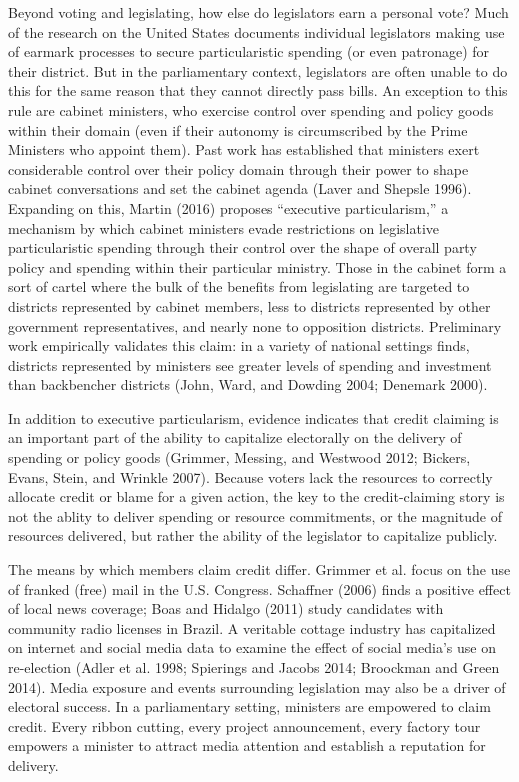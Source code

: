 \documentclass[letter,12pt]{article}
\begin{document}
Beyond voting and legislating, how else do legislators earn a personal vote? Much of the research on the United States documents individual legislators making use of earmark processes to secure particularistic spending (or even patronage) for their district. But in the parliamentary context, legislators are often unable to do this for the same reason that they cannot directly pass bills. An exception to this rule are cabinet ministers, who exercise control over spending and policy goods within their domain (even if their autonomy is circumscribed by the Prime Ministers who appoint them). Past work  has established that ministers exert considerable control over their policy domain through their power to shape cabinet conversations and set the cabinet agenda (Laver and Shepsle 1996). Expanding on this, Martin (2016) proposes ``executive particularism,'' a mechanism by which cabinet ministers evade restrictions on legislative particularistic spending through their control over the shape of overall party policy and spending within their particular ministry. Those in the cabinet form a sort of cartel where the bulk of the benefits from legislating are targeted to districts represented by cabinet members, less to districts represented by other government representatives, and nearly none to opposition districts. Preliminary work empirically validates this claim: in a variety of national settings finds, districts represented by ministers see greater levels of spending and investment than backbencher districts (John, Ward, and Dowding 2004; Denemark 2000).

In addition to executive particularism, evidence indicates that credit claiming is an important part of the ability to capitalize electorally on the delivery of spending or policy goods (Grimmer, Messing, and Westwood 2012; Bickers, Evans, Stein, and Wrinkle 2007). Because voters lack the resources to correctly allocate credit or blame for a given action, the key to the credit-claiming story is not the ablity to deliver spending or resource commitments, or the magnitude of resources delivered, but rather the ability of the legislator to capitalize publicly.

The means by which members claim credit differ. Grimmer et al. focus on the use of franked (free) mail in the U.S. Congress. Schaffner (2006) finds a positive effect of local news coverage; Boas and Hidalgo (2011) study candidates with community radio licenses in Brazil. A veritable cottage industry has capitalized on internet and social media data to examine the effect of social media's use on re-election (Adler et al. 1998; Spierings and Jacobs 2014; Broockman and Green 2014). Media exposure and events surrounding legislation may also be a driver of electoral success. In a parliamentary setting, ministers are empowered to claim credit. Every ribbon cutting, every project announcement, every factory tour empowers a minister to attract media attention and establish a reputation for delivery.
\end{document}
